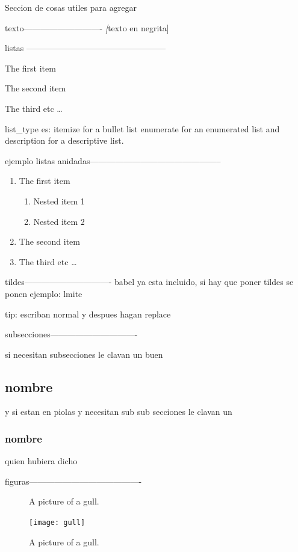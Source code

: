 \iffalse
Seccion de cosas utiles para agregar

texto----------------------------
\textit[texto en negrita]




listas --------------------------------------------------
\begin{list_type}  
\item The first item 
\item The second item 
\item The third etc \ldots 
\end{list_type}

list_type es:
itemize for a bullet list
enumerate for an enumerated list and
description for a descriptive list.

ejemplo listas anidadas-----------------------------------------------

\begin{enumerate}
\item The first item
\begin{enumerate}
\item Nested item 1
\item Nested item 2
\end{enumerate}
\item The second item
\item The third etc \ldots
\end{enumerate}

tildes-------------------------------
babel ya esta incluido, si hay que poner tildes se ponen 
ejemplo: lmite

tip: escriban normal y despues hagan replace

subsecciones-------------------------------

si necesitan subsecciones le clavan un buen \subsection*{nombre}

y si estan en piolas y necesitan sub sub secciones le clavan un \subsubsection*{nombre}

quien hubiera dicho

figuras----------------------------------------

\begin{figure}[h]%
  \caption{A picture of a gull.} %
  \centering
    \texttt{[image: gull]}
    \caption{A picture of a gull.} %
\end{figure}

